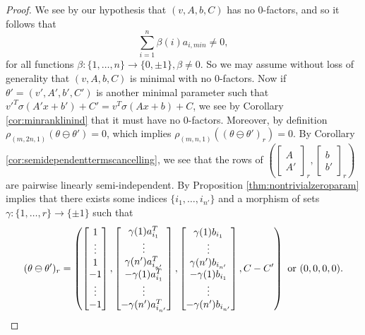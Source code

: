 \documentclass[11pt,letterpaper]{amsart}
\begin{document}
\begin{proof}
    We see by our hypothesis that $(v, A, b, C)$ has no 0-factors, and so it follows that
    $$
    \sum_{i=1}^n \beta(i) a_{i, min} \neq 0,
    $$
    for all functions $\beta: \{1, \ldots, n\}\rightarrow \{0,  \pm 1\}, \beta\neq 0$. So we may assume without loss of generality that $(v, A, b, C)$ is minimal with no 0-factors. Now if $\theta'=(v',A', b', C')$ is another minimal parameter such that $v'^T\sigma (A'x+b')+C'=v^T\sigma (Ax+b)+C$, we see by Corollary \ref{cor:minranklinind} that it must have no 0-factors. Moreover, by definition $\rho_{(m,2n,1)}(\theta\ominus\theta')=0$, which implies $\rho_{(m,n,1)}((\theta\ominus\theta')_r)=0$. By Corollary \ref{cor:semidependenttermscancelling}, we see that the rows of $\left(\begin{bmatrix}
        A \\ A'
    \end{bmatrix}_r, \begin{bmatrix}
        b \\ b'
    \end{bmatrix}_r\right)$ are pairwise linearly semi-independent. By Proposition \ref{thm:nontrivialzeroparam} implies that there exists some indices $\{i_1, \ldots, i_{n'}\}$ and a morphism of sets $\gamma : \{1, \ldots, r\}\rightarrow \{\pm 1\}$ such that 
    $$
    (\theta\ominus \theta')_r = \left(\begin{bmatrix}
        1 \\ \vdots \\ 1 \\ -1 \\ \vdots \\ -1
    \end{bmatrix}, \begin{bmatrix}
        \gamma(1)a_{i_1}^T \\ \vdots \\ \gamma(n')a_{i_{n'}}^T \\ -\gamma(1)a_{i_1}^T \\ \vdots \\ -\gamma(n')a_{i_{n'}}^T
    \end{bmatrix}, \begin{bmatrix}
        \gamma(1)b_{i_1} \\ \vdots \\ \gamma(n')b_{i_{n'}} \\ -\gamma(1)b_{i_1} \\ \vdots \\ -\gamma(n')b_{i_{n'}}
    \end{bmatrix}, C-C'\right) \textup{ or } (0,0,0,0).
$$
\end{proof}
\end{document}
